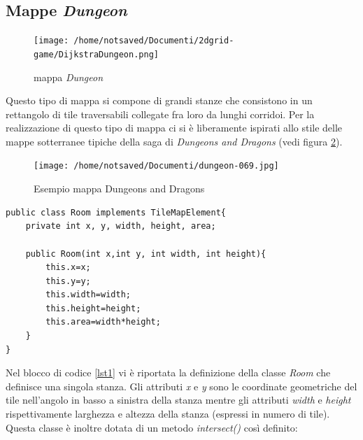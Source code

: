 \documentclass[11pt]{book}
\begin{document}
\subsection{Mappe \emph{Dungeon}}
\begin{figure}[H]
\centering
\texttt{[image: /home/notsaved/Documenti/2dgrid-game/DijkstraDungeon.png]}
\caption{mappa \emph{Dungeon}}
\label{img1}
\end{figure}
\par{Questo tipo di mappa si compone di grandi stanze che consistono in un rettangolo di tile traversabili collegate fra loro da lunghi corridoi. Per la realizzazione di questo tipo di mappa ci si \`e liberamente ispirati allo stile delle mappe sotterranee tipiche della saga di \emph{Dungeons and Dragons} (vedi figura \ref{img111}).}
\begin{figure}[H]
\centering
\texttt{[image: /home/notsaved/Documenti/dungeon-069.jpg]}
\caption{Esempio mappa Dungeons and Dragons}
\label{img111}
\end{figure}
\iffalse
\par {
\begin{minipage}{\linewidth}
\begin{lstlisting}
public class Room implements TileMapElement{
	private int x, y, width, height, area;

	public Room(int x,int y, int width, int height){
		this.x=x;
		this.y=y;
		this.width=width;
		this.height=height;
		this.area=width*height;
	}
}

\end{lstlisting}
\end{minipage}
}

\par{
Nel blocco di codice \ref{lst1} vi \`e riportata la definizione della classe \emph{Room} che definisce una singola stanza. Gli attributi \emph{x} e \emph{y} sono le coordinate geometriche del tile nell'angolo in basso a sinistra della stanza mentre gli attributi \emph{width} e \emph{height} rispettivamente larghezza e altezza della stanza (espressi in numero di tile). Questa classe \`e inoltre dotata di un metodo \emph{intersect()} cos\`i definito:}
\end{document}
